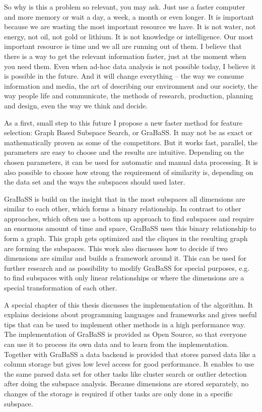 So why is this a problem so relevant, you may ask. Just use a faster computer and more memory or wait a day, a week, a month or even longer. It is important because we are wasting the most important resource we have. It is not water, not energy, not oil, not gold or lithium. It is not knowledge or intelligence. Our most important resource is time and we all are running out of them. I believe that there is a way to get the relevant information faster, just at the moment when you need them. Even when ad-hoc data analysis is not possible today, I believe it is possible in the future. And it will change everything -- the way we consume information and media, the art of describing our environment and our society, the way people life and communicate, the methods of research, production, planning and design, even the way we think and decide.

As a first, small step to this future I propose a new faster method for feature selection: Graph Based Subspace Search, or GraBaSS. It may not be as exact or mathematically proven as some of the competitors. But it works fast, parallel, the parameters are easy to choose and the results are intuitive. Depending on the chosen parameters, it can be used for automatic and manual data processing. It is also possible to choose how strong the requirement of similarity is, depending on the data set and the ways the subspaces should used later.

GraBaSS is build on the insight that in the most subspaces all dimensions are similar to each other, which forms a binary relationship. In contrast to other approaches, which often use a bottom up approach to find subspaces and require an enormous amount of time and space, GraBaSS uses this binary relationship to form a graph. This graph gets optimized and the cliques in the resulting graph are forming the subspaces. This work also discusses how to decide if two dimensions are similar and builds a framework around it. This can be used for further research and as possibility to modify GraBaSS for special purposes, e.g. to find subspaces with only linear relationships or where the dimensions are a special transformation of each other.

A special chapter of this thesis discusses the implementation of the algorithm. It explains decisions about programming languages and frameworks and gives useful tips that can be used to implement other methods in a high performance way. The implementation of GraBaSS is provided as Open Source, so that everyone can use it to process its own data and to learn from the implementation. Together with GraBaSS a data backend is provided that stores parsed data like a column storage but gives low level access for good performance. It enables to use the same parsed data set for other tasks like cluster search or outlier detection after doing the subspace analysis. Because dimensions are stored separately, no changes of the storage is required if other tasks are only done in a specific subspace.
